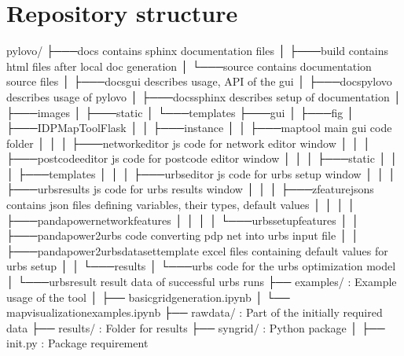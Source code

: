 \documentclass[letterpaper,10pt,english]{sphinxmanual}
\begin{document}
\section{Repository structure}
\label{\detokenize{index:repository-structure}}
\begin{sphinxVerbatim}[commandchars=\\\{\}]
pylovo/
├───docs                                        contains sphinx documentation files
│   ├───build                                   contains html files after local doc generation
│   └───source                                  contains documentation source files
│       ├───docs\PYGZus{}gui                            describes usage, API of the gui
│       ├───docs\PYGZus{}pylovo                         describes usage of pylovo
│       ├───docs\PYGZus{}sphinx                         describes setup of documentation
│       ├───images
│       ├───\PYGZus{}static
│       └───\PYGZus{}templates
├───gui
│   ├───fig
│   ├───IDP\PYGZus{}MapTool\PYGZus{}Flask
│   │   ├───instance
│   │   ├───maptool                             main gui code folder
│   │   │   ├───network\PYGZus{}editor                  js code for network editor window
│   │   │   ├───postcode\PYGZus{}editor                 js code for postcode editor window
│   │   │   ├───static
│   │   │   ├───templates
│   │   │   ├───urbs\PYGZus{}editor                     js code for urbs setup window
│   │   │   ├───urbs\PYGZus{}results                    js code for urbs results window
│   │   │   ├───z\PYGZus{}feature\PYGZus{}jsons                 contains json files defining variables, their types, default values
│   │   │   │   ├───pandapower\PYGZus{}network\PYGZus{}features
│   │   │   │   └───urbs\PYGZus{}setup\PYGZus{}features
│   │   ├───pandapower2urbs                     code converting pdp net into urbs input file
│   │   ├───pandapower2urbs\PYGZus{}dataset\PYGZus{}template    excel files containing default values for urbs setup
│   │   └───results
│   └───urbs                                    code for the urbs optimization model
│       └───urbs\PYGZus{}result                         result data of successful urbs runs
├── examples/ :                                 Example usage of the tool
│   ├── basic\PYGZus{}grid\PYGZus{}generation.ipynb
│   └── map\PYGZus{}visualization\PYGZus{}examples.ipynb
├── raw\PYGZus{}data/ :                                 Part of the initially required data
├── results/ :                                  Folder for results
├── syngrid/ :                                  Python package
│   ├── \PYGZus{}\PYGZus{}init\PYGZus{}\PYGZus{}.py :                           Package requirement

\end{sphinxVerbatim}
\end{document}
